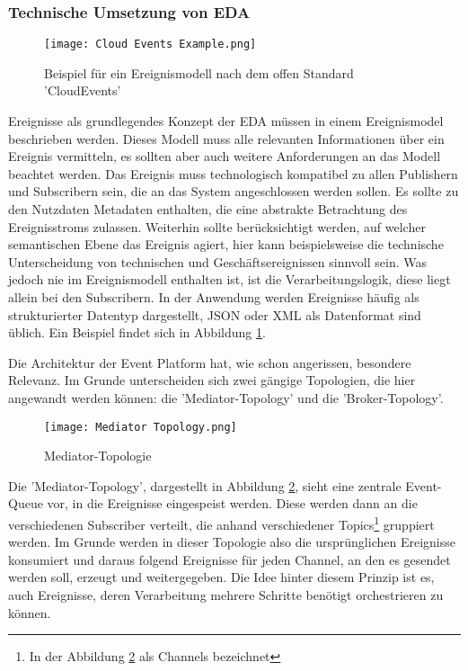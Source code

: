 \subsubsection*{Technische Umsetzung von \ac{EDA}}
\label{teda}
\begin{figure}[H]
  \centering
  \texttt{[image: Cloud Events Example.png]}
  \caption[Beispiel für ein Ereignismodell]{Beispiel für ein Ereignismodell nach dem offen Standard 'CloudEvents' \footnotemark}
  \label{cloudeventslabel}
\end{figure}
Ereignisse als grundlegendes Konzept der \ac{EDA} müssen in einem Ereignismodel beschrieben werden. Dieses Modell muss alle relevanten Informationen über ein Ereignis vermitteln, es sollten aber auch weitere Anforderungen an das Modell beachtet werden. Das Ereignis muss technologisch kompatibel zu allen Publishern und Subscribern sein, die an das System angeschlossen werden sollen. Es sollte zu den Nutzdaten Metadaten enthalten, die eine abstrakte Betrachtung des Ereignisstroms zulassen. Weiterhin sollte berücksichtigt werden, auf welcher semantischen Ebene das Ereignis agiert, hier kann beispielsweise die technische Unterscheidung von technischen und Geschäftsereignissen sinnvoll sein. Was jedoch nie im Ereignismodell enthalten ist, ist die Verarbeitungslogik, diese liegt allein bei den Subscribern. \cite[Vgl. ][S. 95]{EDA2010} In der Anwendung werden Ereignisse häufig als strukturierter Datentyp dargestellt, JSON oder XML als Datenformat sind üblich. Ein Beispiel findet sich in Abbildung \ref{cloudeventslabel}.

Die Architektur der Event Platform hat, wie schon angerissen, besondere Relevanz. Im Grunde unterscheiden sich zwei gängige Topologien, die hier angewandt werden können: die 'Mediator-Topology' und die 'Broker-Topology'. 
\begin{figure}[H]
  \centering
  \texttt{[image: Mediator Topology.png]}
  \caption[Mediator-Topologie]{Mediator-Topologie \cite[][]{wickramarachchi_2017_event}}
  \label{mediatortop}
\end{figure}
Die 'Mediator-Topology', dargestellt in Abbildung \ref{mediatortop}, sieht eine zentrale Event-Queue vor, in die Ereignisse eingespeist werden. Diese werden dann an die verschiedenen Subscriber verteilt, die anhand verschiedener Topics\footnote{In der Abbildung \ref{mediatortop} als Channels bezeichnet} gruppiert werden. Im Grunde werden in dieser Topologie also die ursprünglichen Ereignisse konsumiert und daraus folgend Ereignisse für jeden Channel, an den es gesendet werden soll, erzeugt und weitergegeben. Die Idee hinter diesem Prinzip ist es, auch Ereignisse, deren Verarbeitung mehrere Schritte benötigt orchestrieren zu können. \cite[Vgl. ][]{wickramarachchi_2017_event} \\

